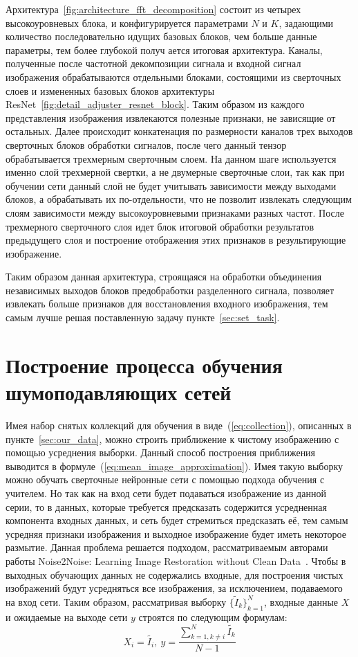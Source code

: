 Архитектура~\ref{fig:architecture_fft_decomposition} состоит из четырех высокоуровневых блока, и конфигурируется параметрами $N$ и $K$, задающими количество последовательно идущих базовых блоков, чем больше данные параметры, тем более глубокой получ ается итоговая архитектура. Каналы, полученные после частотной декомпозиции сигнала и входной сигнал изображения обрабатываются отдельными блоками, состоящими из сверточных слоев и измененных базовых блоков архитектуры ResNet~\ref{fig:detail_adjuster_resnet_block}. Таким образом из каждого представления изображения извлекаются полезные признаки, не зависящие от остальных. Далее происходит конкатенация по размерности каналов трех выходов сверточных блоков обработки сигналов, после чего данный тензор обрабатывается трехмерным сверточным слоем. На данном шаге используется именно слой трехмерной свертки, а не двумерные сверточные слои, так как при обучении сети данный слой не будет учитывать зависимости между выходами блоков, а обрабатывать их по-отдельности, что не позволит извлекать следующим слоям зависимости между высокоуровневыми признаками разных частот. После трехмерного сверточного слоя идет блок итоговой обработки результатов предыдущего слоя и построение отображения этих признаков в результирующие изображение. 

Таким образом данная архитектура, строящаяся на обработки объединения независимых выходов блоков предобработки разделенного сигнала, позволяет извлекать больше признаков для восстановления входного изображения, тем самым лучше решая поставленную задачу пункте~\ref{sec:set_task}.


\section{Построение процесса обучения шумоподавляющих сетей}

Имея набор снятых коллекций для обучения в виде~(\ref{eq:collection}), описанных в пункте~\ref{sec:our_data}, можно строить приближение к чистому изображению с помощью усреднения выборки. Данный способ построения приближения выводится в формуле~(\ref{eq:mean_image_approximation}). Имея такую выборку можно обучать сверточные нейронные сети с помощью подхода обучения с учителем. Но так как на вход сети будет подаваться изображение из данной серии, то в данных, которые требуется предсказать содержится усредненная компонента входных данных, и сеть будет стремиться предсказать её, тем самым усредняя признаки изображения и выходное изображение будет иметь некоторое размытие. Данная проблема решается подходом, рассматриваемым авторами работы Noise2Noise: Learning Image Restoration without Clean Data~\autocite{Noise2NoisePaper}. Чтобы в выходных обучающих данных не содержались входные, для построения чистых изображений будут усредняться все изображения, за исключением, подаваемого на вход сети. Таким образом, рассматривая выборку $\{\tilde{I}_k\}_{k=1}^{N}$, входные данные $X$ и ожидаемые на выходе сети $y$ строятся по следующим формулам:
\begin{equation}\label{eq:dataset}
X_i = \tilde{I_i},\ y = \frac{\sum_{k=1, k \ne i}^{N}\tilde{I_k}}{N - 1}
\end{equation}

